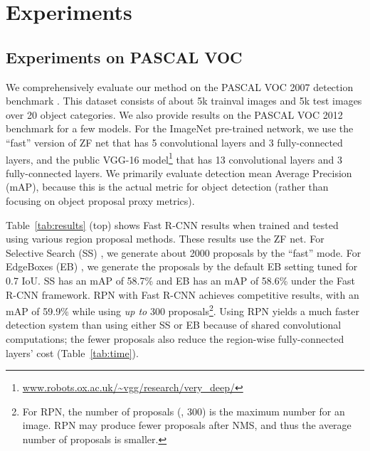 \documentclass[10pt,journal,cspaper,compsoc]{IEEEtran}
\begin{document}
\section{Experiments}

\subsection{Experiments on PASCAL VOC}

We comprehensively evaluate our method on the PASCAL VOC 2007 detection benchmark \cite{Everingham2007}. This dataset consists of about 5k trainval images and 5k test images over 20 object categories.
We also provide results on the PASCAL VOC 2012 benchmark for a few models.
For the ImageNet pre-trained network, we use the ``fast'' version of ZF net \cite{Zeiler2014} that has 5 convolutional layers and 3 fully-connected layers, and the public VGG-16 model\footnote{\url{www.robots.ox.ac.uk/~vgg/research/very_deep/}} \cite{Simonyan2015} that has 13 convolutional layers and 3 fully-connected layers.
We primarily evaluate detection mean Average Precision (mAP), because this is the actual metric for object detection (rather than focusing on object proposal proxy metrics).

Table~\ref{tab:results} (top) shows Fast R-CNN results when trained and tested using various region proposal methods. These results use the ZF net.
For Selective Search (SS) \cite{Uijlings2013}, we generate about 2000 proposals by the ``fast'' mode. For EdgeBoxes (EB) \cite{Zitnick2014}, we generate the proposals by the default EB setting tuned for 0.7 IoU.
SS has an mAP of 58.7\% and EB has an mAP of 58.6\% under the Fast R-CNN framework.
RPN with Fast R-CNN achieves competitive results, with an mAP of 59.9\% while using \emph{up to} 300 proposals\footnote{For RPN, the number of proposals (\eg, 300) is the maximum number for an image. RPN may produce fewer proposals after NMS, and thus the average number of proposals is smaller.}.
Using RPN yields a much faster detection system than using either SS or EB because of shared convolutional computations; the fewer proposals also reduce the region-wise fully-connected layers' cost (Table~\ref{tab:time}).
\end{document}
